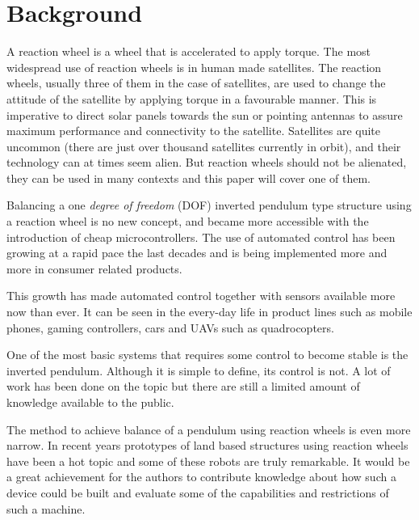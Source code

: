 \documentclass[a4paper,11pt]{kth-mag}
\begin{document}
\section{Background}
A reaction wheel is a wheel that is accelerated to apply torque. The most widespread use of reaction wheels is in human made satellites. The  reaction wheels, usually three of them in the case of satellites, are used to change the attitude of the satellite by applying torque in a favourable manner. This is imperative to direct solar panels towards the sun or pointing antennas to assure maximum performance and connectivity to the satellite. Satellites are quite uncommon (there are just over thousand satellites currently in orbit), and their technology can at times seem alien. But reaction wheels should not be alienated, they can be used in many contexts and this paper will cover one of them.  

Balancing a one \textit{degree of freedom} (DOF) inverted pendulum type structure using a reaction wheel is no new concept, and became more accessible with the introduction of cheap microcontrollers.
The use of automated control has been growing at a rapid pace the last decades and is being implemented
more and more in consumer related products.  

This growth has made automated control together with sensors available more now than ever. It can be seen in the every-day life in product lines such as mobile phones, gaming controllers, cars and UAVs such as quadrocopters.

One of the most basic systems that requires some control to become stable is the inverted pendulum. 
Although it is simple to define, its control is not. A lot of work has been done on the topic
but there are still a limited amount of knowledge available to the public. 

The method to achieve balance of a pendulum using reaction wheels is even more narrow. 
In recent years prototypes of land based structures using reaction wheels have been a hot topic and some of these robots are truly remarkable. 
It would be a great achievement for the authors to contribute knowledge about how such a device could be built and evaluate some of
the capabilities and restrictions of such a machine.
\end{document}

